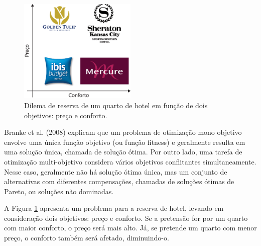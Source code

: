 \begin{figure}[htb]
	\centering
	\caption{\label{fig:hotel-multi}Dilema de reserva de um quarto de hotel em função de dois objetivos: preço e conforto.} 
	\includegraphics[width=0.5\textwidth]{imagens/hotel-multi.eps}
\end{figure}

Branke et al. (2008) \cite{branke2008multiobjective} explicam que um problema de otimização mono objetivo envolve uma única função objetivo (ou função fitness) e geralmente resulta em uma solução única, chamada de solução ótima. Por outro lado, uma tarefa de otimização multi-objetivo considera vários objetivos conflitantes simultaneamente. Nesse caso, geralmente não há solução ótima única, mas um conjunto de alternativas com diferentes compensações, chamadas de soluções ótimas de Pareto, ou soluções não dominadas.

A Figura \ref{fig:hotel-multi} apresenta um problema para a reserva de hotel, levando em consideração dois objetivos: preço e conforto. Se a pretensão for por um quarto com maior conforto, o preço será mais alto. Já, se pretende um quarto com menor preço, o conforto também será afetado, diminuindo-o.

